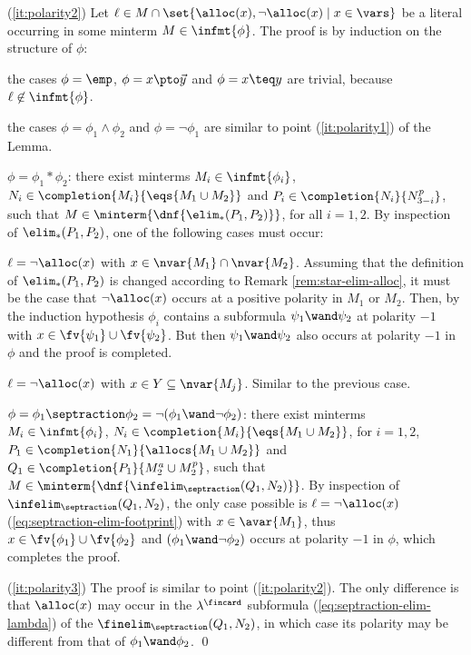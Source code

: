 {  \noindent(\ref{it:polarity2}) Let $\ell \in M \cap \set{\alloc(x),
    \neg\alloc(x) \mid x \in \vars}$ be a literal occurring in some
  minterm $M \in \infmt{\phi}$. The proof is by induction on the
  structure of $\phi$: \begin{compactitem}
  \item the cases $\phi=\emp$, $\phi=x \pto \vec{y}$ and $\phi= x \teq
    y$ are trivial, because $\ell \not\in \infmt{\phi}$.
  \item the cases $\phi=\phi_1\wedge\phi_2$ and $\phi=\neg\phi_1$ are
    similar to point (\ref{it:polarity1}) of the Lemma.
  \item $\phi = \phi_1 * \phi_2$: there exist minterms $M_i \in
    \infmt{\phi_i}$, $N_i \in \completion{M_i}{\eqs{M_1\cup M_2}}$ and
    $P_i \in \completion{N_i}{N_{3-i}^p}$, such that $M \in
    \minterm{\dnf{\elim_*(P_1,P_2)}}$, for all $i=1,2$. By inspection
    of $\elim_*(P_1,P_2)$, one of the following cases must
    occur:\begin{compactitem}
    \item $\ell = \neg \alloc(x)$ with $x \in \nvar{M_1} \cap
      \nvar{M_2}$. Assuming that the definition of $\elim_*(P_1,P_2)$
      is changed according to Remark \ref{rem:star-elim-alloc}, it
      must be the case that $\neg\alloc(x)$ occurs at a positive polarity in $M_1$
      or $M_2$. Then, by the induction hypothesis $\phi_i$ contains a
      subformula $\psi_1 \wand \psi_2$ at polarity $-1$ with $x \in
      \fv{\psi_1} \cup \fv{\psi_2}$. But then $\psi_1 \wand \psi_2$
      also occurs at polarity $-1$ in $\phi$ and the proof is
      completed.
    \item $\ell = \neg \alloc(x)$ with $x \in Y \subseteq
      \nvar{M_j}$. Similar to the previous case.
    \end{compactitem}
  \item $\phi = \phi_1\septraction\phi_2 =
    \neg(\phi_1\wand\neg\phi_2)$: there exist minterms $M_i \in
    \infmt{\phi_i}$, $N_i \in \completion{M_i}{\eqs{M_1 \cup M_2}}$,
    for $i=1,2$, $P_1 \in \completion{N_1}{\allocs{M_1 \cup M_2}}$ and
    $Q_1 \in \completion{P_1}{M_2^a \cup M_2^p}$, such that $M \in
    \minterm{\dnf{\infelim_\septraction(Q_1,N_2)}}$. By inspection of
    $\infelim_\septraction(Q_1,N_2)$, the only case possible is $\ell
    = \neg \alloc(x)$ (\ref{eq:septraction-elim-footprint}) with $x
    \in \avar{M_1}$, thus $x \in \fv{\phi_1}\cup \fv{\phi_2}$ and
    $(\phi_1 \wand \neg \phi_2)$ occurs at polarity $-1$ in $\phi$,
    which completes the proof. 
  \end{compactitem}
  
  \noindent(\ref{it:polarity3}) The proof is similar to point
  (\ref{it:polarity2}). The only difference is that $\alloc(x)$ may
  occur in the $\lambda^\fincard$ subformula
  (\ref{eq:septraction-elim-lambda}) of the
  $\finelim_\septraction(Q_1,N_2)$, in which case its polarity may be
  different from that of $\phi_1\wand\phi_2$. \qed}


